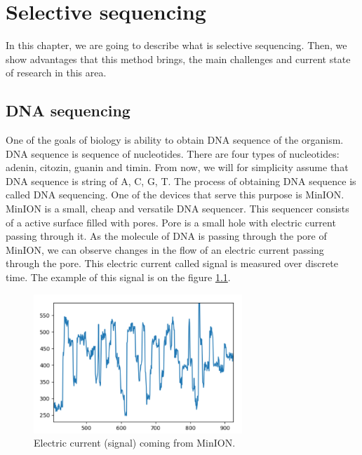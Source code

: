 \chapter{Selective sequencing}

\label{kap:selSeq} %

In this chapter, we are going to describe what is selective sequencing. Then, we
show advantages that this method brings, the main challenges and current state of
research in this area.

\section{DNA sequencing}

One of the goals of biology is ability to obtain DNA sequence of the organism. DNA sequence
is sequence of nucleotides. There are four types of nucleotides: adenin, citozin,
guanin and timin. From now, we will for simplicity assume that DNA sequence is
string of A, C, G, T. The process of obtaining DNA sequence is called DNA sequencing.
One of the devices that serve this purpose is MinION\cite{lu2016oxford}. MinION is a small, cheap and
versatile DNA sequencer. This sequencer consists of a active surface
filled with pores. Pore is a small hole with electric current passing through it. 
As the molecule of DNA is passing through the pore of MinION, we can observe
changes in the flow of an electric current passing through the pore. This electric
current called signal is measured over discrete time. The example of this signal
is on the figure \ref{obr:minIonCurrent}.

\begin{figure}
\centerline{\includegraphics[width=0.7\textwidth, height=0.3\textheight]{images/signal}}
\caption[MinION signal]{Electric current (signal) coming from MinION.}
\label{obr:minIonCurrent}
\end{figure}

